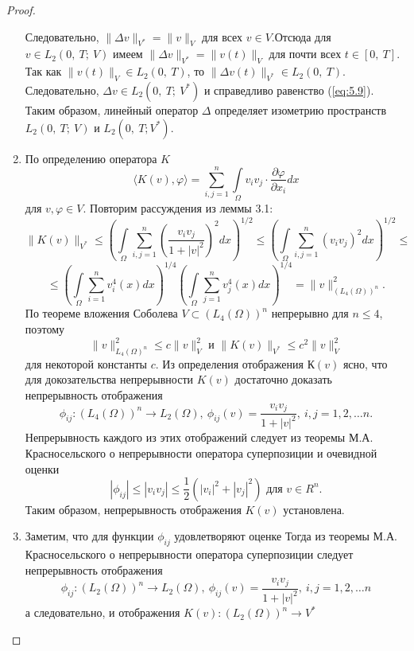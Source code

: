 \begin{proof}
\begin{enumerate}
        Следовательно, \linebreak $\| \Delta v \|_{V^\ast} = \| v \|_V$ для всех $v \in V$.Отсюда для $v \in L_2(0, \ T; \ V)$ имеем
        \linebreak $\| \Delta v \|_{V^\ast} = \| v(t) \|_V$ для почти всех $t \in [0, \ T]$.
        Так как $\| v(t) \|_V \in L_2(0, \ T)$,
        то $\| \Delta v(t)\|_{V^*} \in L_2(0, \ T)$. Следовательно, $\Delta v \in L_2(0, \ T; \ V^\ast)$ и справедливо
        равенство (\ref{eq:5.9}). Таким образом, линейный оператор $\Delta$ определяет изометрию пространств $L_2(0, \ T; \ V)$ и $L_2(0, \ T; V^\ast)$.
        \item По определению оператора $K$
        $$\langle K(v), \varphi \rangle = \sum_{i,j=1}^{n}\int\limits_\Omega v_iv_j \cdot \frac{\partial \varphi }{\partial x_i}dx$$
        для $v, \varphi \in V$. Повторим рассуждения из леммы 3.1:
        $$\| K(v) \|_{V^*} \le \left(\int\limits_\Omega \sum_{i, j=1}^n \left(\frac{v_i v_j}{1+|v|^2}\right)^2 dx \right)^{1/2}
        \le \left(\int\limits_\Omega \sum_{i, j=1}^n (v_i v_j)^2 dx \right)^{1/2} \le$$
        $$ \le \left(\int\limits_\Omega \sum_{i=1}^n v_i^4(x)dx \right)^{1/4} \left(\int\limits_\Omega \sum_{j=1}^n v_j^4(x)dx \right)^{1/4} =
        \| v \|^2_{(L_4(\Omega))^n}.$$
        По теореме вложения Соболева $V \subset (L_4(\Omega))^n$ непрерывно для $n \le 4$, поэтому
        $$\| v \|^2_{L_4(\Omega)^n} \le c \| v \|^2_V \textrm{ и } \| K(v) \|_{V^*}
        \le c^2 \| v \|^2_V$$ для некоторой константы $c$.
        Из определения отображения $К(v)$ ясно, что для докозательства непрерывности $K(v)$ достаточно доказать непрерывность отображения
        $$\phi_{ij}: (L_4(\Omega))^n \rightarrow L_2(\Omega), \ \phi_{ij}(v) = \frac{v_i v_j}{1+|v|^2}, \ i,j = 1, 2, \dots n.$$
        Непрерывность каждого из этих отображений следует из теоремы М.А. Красносельского о непрерывности оператора суперпозиции и очевидной оценки
        $$|\phi_{ij}| \le |v_i v_j| \le \frac{1}{2}(|v_i|^2+|v_j|^2) \textrm{ для } v \in R^n.$$
        Таким образом, непрерывность отображения $K(v)$ установлена.
        \item Заметим, что для функции $\phi_{ij}$ удовлетворяют оценке
        Тогда из теоремы М.А. Красносельского о непрерывности оператора суперпозиции следует непрерывность отображения
        $$\phi_{ij}: (L_2(\Omega))^n \rightarrow L_2(\Omega), \ \phi_{ij}(v) = \frac{v_i v_j}{1+|v|^2}, \ i,j = 1, 2, \dots n$$
        а следовательно, и отображения $K(v): (L_2(\Omega))^n \rightarrow V^*$


\end{enumerate}
\end{proof}
